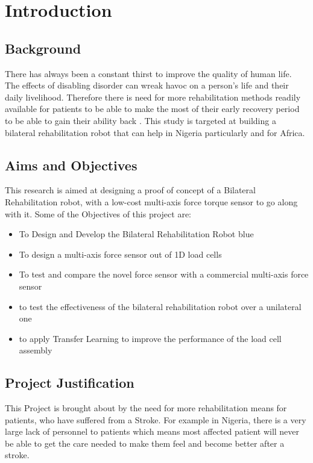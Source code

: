 \chapter{Introduction}\label{Ch:1}		%

\section{Background}\label{sec:rehabintroduction}	
There has always been a constant thirst to improve the quality of human life. The effects of disabling disorder can wreak havoc on a person’s life and their daily livelihood. Therefore there is need for more rehabilitation methods readily available for patients to be able to make the most of their early recovery period to be able to gain their ability back \cite{Langhorne2011a}. This study is targeted at building a bilateral rehabilitation robot that can help in Nigeria particularly and for Africa.

\section{Aims and Objectives}\label{Aims}
This research is aimed at designing a proof of concept of a Bilateral Rehabilitation robot, with a low-cost multi-axis force torque sensor to go along with it. Some of the Objectives of this project are:
\begin{itemize}
	\item To Design and Develop the Bilateral Rehabilitation Robot \ac{blue}
	\item To design a multi-axis force sensor out of 1D load cells
	\item To test and compare the novel force sensor with a commercial multi-axis force sensor
	\item to test the effectiveness of the bilateral rehabilitation robot over a unilateral one
	\item to apply Transfer Learning to improve the performance of the load cell assembly %
\end{itemize}

\section{Project Justification}\label{Justification}
This Project is brought about by the need for more rehabilitation means for patients, who have suffered from a Stroke. For example in Nigeria, there is a very large lack of personnel to patients which means most affected patient will never be able to get the care needed to make them feel and become better after a stroke.

